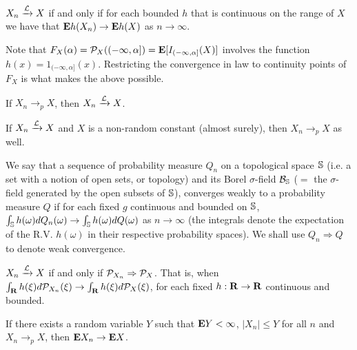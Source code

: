 \begin{proposition*} 
$X_n \xrightarrow{\mathcal{L}} X$ if and only if for each bounded $h$ that is continuous
on the range of $X$ we have that $\mathbf{E} h(X_n) \rightarrow \mathbf{E} h(X)$ as $n
\rightarrow \infty$.
\end{proposition*} 

\begin{remark*} 
Note that $F_X(\alpha) = \mathcal{P}_X ((-\infty, \alpha]) = \mathbf{E}[I_{(-\infty, \alpha]}
(X)]$ involves the function $h(x) = 1_{(-\infty, \alpha]}(x)$. Restricting the
convergence in law to continuity points of $F_X$ is what makes the above
possible.
\end{remark*} 

\begin{proposition*} 
If $X_n \rightarrow_p X$, then $X_n \xrightarrow{\mathcal{L}} X$.
\end{proposition*} 

\begin{proposition*} 
If $X_n \xrightarrow{\mathcal{L}} X$ and $X$ is a non-random constant (almost surely),
then $X_n \rightarrow_p X$ as well.
\end{proposition*} 

\begin{definition*} 
We say that a sequence of probability measure $Q_n$ on a topological space $\mathbb{S}$
(i.e. a set with a notion of open sets, or topology) and its Borel
$\sigma$-field $\mathcal{B}_{\mathbb{S}}$ ($ = $ the $\sigma$-field generated by the open subsets
of $\mathbb{S}$), converges weakly to a probability measure $Q$ if for each fixed $g$
continuous and bounded on $\mathbb{S}$, $\int_{\mathbb{S}} h(\omega) dQ_n(\omega) \rightarrow
\int_{\mathbb{S}} h(\omega) dQ(\omega)$ as $n \rightarrow \infty$ (the integrals denote
the expectation of the R.V. $h(\omega)$ in their respective probability spaces).
We shall use $Q_n \Rightarrow Q$ to denote weak convergence.
\end{definition*} 

\begin{example*} 
$X_n \xrightarrow{\mathcal{L}} X$ if and only if $\mathcal{P}_{X_n} \Rightarrow \mathcal{P}_X$. That
is, when $\int_{\mathbf{R}} h(\xi) d\mathcal{P}_{X_n} (\xi) \rightarrow \int_{\mathbf{R}} h(\xi)
d\mathcal{P}_X(\xi)$, for each fixed $h: \mathbf{R} \rightarrow \mathbf{R}$ continuous and bounded.
\end{example*} 

\begin{theorem*}
If there exists a random variable $Y$ such that $\mathbf{E} Y < \infty$, $|X_n| \le Y$
for all $n$ and $X_n \rightarrow_p X$, then $\mathbf{E} X_n \rightarrow \mathbf{E} X$.
\end{theorem*} 

